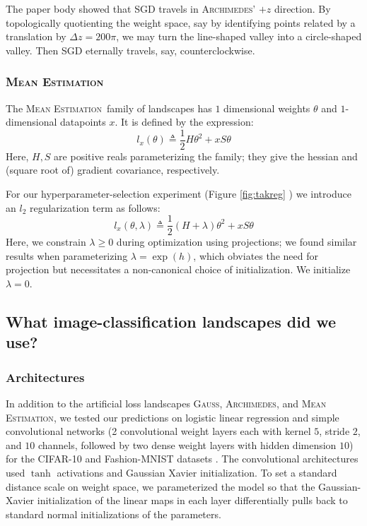 \documentclass{article}
\newcommand{\ofthree}[1]{
    {\tiny \raisebox{0.04cm}{$
        \ifthenelse{\equal{#1}{0}}{{\color{moor}\blacksquare}}{\square}
        \ifthenelse{\equal{#1}{1}}{{\color{moor}\blacksquare}}{\square}    
        \ifthenelse{\equal{#1}{2}}{{\color{moor}\blacksquare}}{\square}
    $}}%
}
\theoremstyle{plain}
\theoremstyle{definition}
\newcommand{\Gauss}{\textsc{Gauss}}
\newcommand{\Archimedes}{\textsc{Archimedes}}
\newcommand{\MeanEstimation}{\textsc{Mean Estimation}}
\begin{document}
            The paper body showed that SGD travels in \Archimedes' $+z$
            direction.  By topologically quotienting the weight space, say by
            identifying points related by a translation by $\Delta z = 200\pi$,
            we may turn the line-shaped valley into a circle-shaped valley.
            Then SGD eternally travels, say, counterclockwise.
           
        \subsubsection*{\MeanEstimation}
            The \MeanEstimation\, family of landscapes has $1$ dimensional
            weights $\theta$ and $1$-dimensional datapoints $x$.  It is defined
            by the expression:
            $$
                l_x(\theta)
                \triangleq
                \frac{1}{2} H \theta^2 + x S \theta
            $$
            Here, $H, S$ are positive reals parameterizing the family; they
            give the hessian and (square root of) gradient covariance,
            respectively.

            For our hyperparameter-selection experiment (Figure
            \ref{fig:takreg}\ofthree{2}) we introduce an $l_2$
            regularization term as follows:
            $$
                l_x(\theta, \lambda)
                \triangleq
                \frac{1}{2} (H + \lambda) \theta^2 + x S \theta
            $$
            Here, we constrain $\lambda\geq 0$ during optimization using
            projections; we found similar results when parameterizing $\lambda
            = \exp(h)$, which obviates the need for projection but necessitates
            a non-canonical choice of initialization.  We initialize
            $\lambda=0$.

    \subsection{What image-classification landscapes did we use?}   \label{appendix:natural}

        \subsubsection*{Architectures}
            In addition to the artificial loss landscapes
            \Gauss, \Archimedes, and \MeanEstimation, 
            we tested our predictions on logistic linear regression
            and simple convolutional networks (2 convolutional weight layers
            each with kernel $5$, stride $2$, and $10$ channels, followed by
            two dense weight layers with hidden dimension $10$) for the
            CIFAR-10 \cite{kr09} and Fashion-MNIST datasets \cite{xi17}.  The
            convolutional architectures used $\tanh$ activations and Gaussian
            Xavier initialization.  To set a standard distance scale on weight
            space, we parameterized the model so that the
            Gaussian-Xavier initialization of the linear maps in each layer
            differentially pulls back to standard normal initializations of the
            parameters.
            
\end{document}
